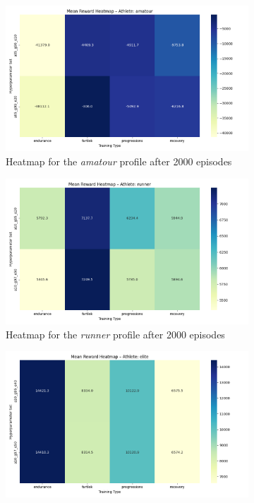 \begin{figure}
    \centering
    \begin{subfigure}[t]{0.75\textwidth}
        \centering
        \includegraphics[width=\textwidth]{images/analysis_outputs_2000/heatmap_amatour.png}
      \caption{Heatmap for the \textit{amatour} profile after 2000 episodes}
    \label{fig:amatour-2000}
    \end{subfigure}
    \begin{subfigure}[t]{0.75\textwidth}
        \centering
        \includegraphics[width=\textwidth]{images/analysis_outputs_2000/heatmap_runner.png}
        \caption{Heatmap for the \textit{runner} profile after 2000 episodes}
    \label{fig:runner-2000}
    \end{subfigure}
    \begin{subfigure}[t]{0.75\textwidth}
        \centering
        \includegraphics[width=\textwidth]{images/analysis_outputs_2000/heatmap_elite.png}

\end{subfigure}
\end{figure}
